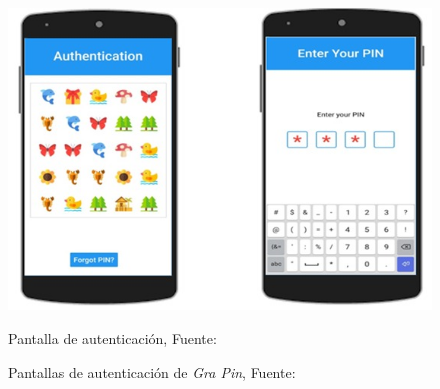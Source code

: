\begin{anexos}
\begin{figure}[H]
\begin{minipage}[b]{0.4\linewidth}
		\includegraphics[width=\linewidth]{grapin-auth.jpg}
		\caption{Pantalla de autenticación, Fuente: \cite{kausar2022gra}}
		
	\end{minipage}
	\caption{Pantallas de autenticación de \textit{Gra Pin}, Fuente: \cite{kausar2022gra}}
	\label{gra-pin-screens}
\end{figure}





\end{anexos}
